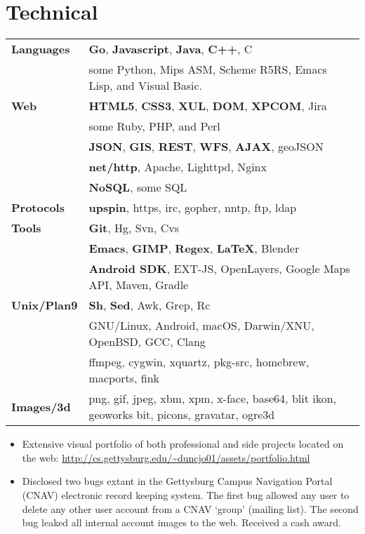 \documentclass[11pt]{article}
\begin{document}
\section*{Technical}
	\begin{tabular}{ l l }
  	\textbf{Languages} & \textbf{Go}, \textbf{Javascript}, \textbf{Java}, \textbf{C++}, C \\
  	& some Python, Mips ASM, Scheme R5RS, Emacs Lisp, and  Visual Basic. \\
  	
  	\textbf{Web} & \textbf{HTML5}, \textbf{CSS3}, \textbf{XUL}, \textbf{DOM}, \textbf{XPCOM}, Jira \\
  	& some Ruby, PHP, and Perl \\
  	& \textbf{JSON}, \textbf{GIS}, \textbf{REST}, \textbf{WFS}, \textbf{AJAX}, geoJSON \\
  	& \textbf{net/http}, Apache, Lighttpd, Nginx \\
  	& \textbf{NoSQL}, some SQL \\
  	\textbf{Protocols} & \textbf{upspin}, https, irc, gopher, nntp, ftp, ldap \\
  	
  	\textbf{Tools} & \textbf{Git}, Hg, Svn, Cvs \\
  	& \textbf{Emacs}, \textbf{GIMP}, \textbf{Regex}, \textbf{\LaTeX}, Blender \\
  	& \textbf{Android SDK}, EXT-JS, OpenLayers, Google Maps API, Maven, Gradle \\
  	
  	\textbf{Unix/Plan9} & \textbf{Sh}, \textbf{Sed}, Awk, Grep, Rc \\
  	& GNU/Linux, Android, macOS, Darwin/XNU, OpenBSD, GCC, Clang \\
  	& ffmpeg, cygwin, xquartz, pkg-src, homebrew, macports, fink \\
  	\textbf{Images/3d} & png, gif, jpeg, xbm, xpm, x-face, base64, blit ikon, geoworks bit, picons, gravatar, ogre3d \\
	\end{tabular}
	
\begin{itemize}
	\item Extensive visual portfolio of both professional and side projects located on the web: \url{http://cs.gettysburg.edu/~duncjo01/assets/portfolio.html}
	\item Disclosed two bugs extant in the Gettysburg Campus Navigation Portal (CNAV) electronic record keeping system. The first bug allowed any user to delete any other user account from a CNAV `group' (mailing list). The second bug leaked all internal account images to the web. Received a cash award.
\end{itemize}
\end{document}
